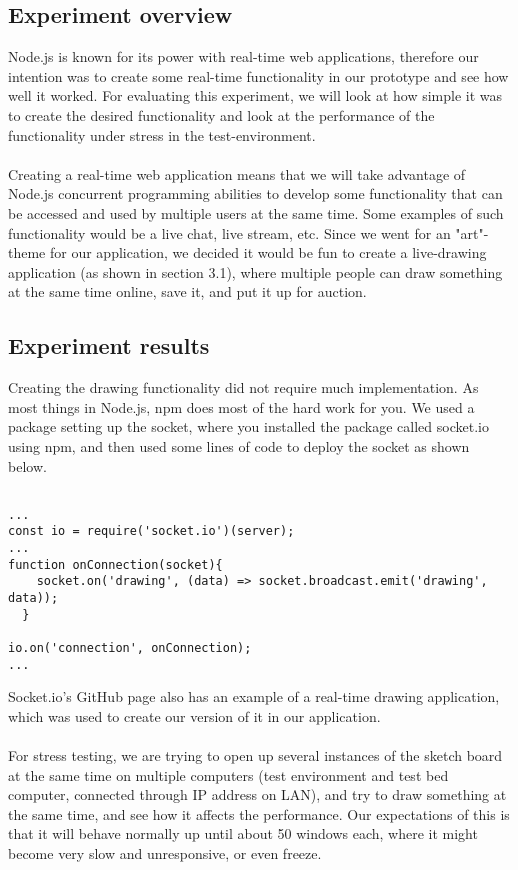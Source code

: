 \subsection{Experiment overview}
Node.js is known for its power with real-time web applications, therefore our intention was to create some real-time functionality in our prototype and see how well it worked. For evaluating this experiment, we will look at how simple it was to create the desired functionality and look at the performance of the functionality under stress in the test-environment.
\\\\
Creating a real-time web application means that we will take advantage of Node.js concurrent programming abilities to develop some functionality that can be accessed and used by multiple users at the same time. Some examples of such functionality would be a live chat, live stream, etc. Since we went for an "art"-theme for our application, we decided it would be fun to create a live-drawing application (as shown in section 3.1), where multiple people can draw something at the same time online, save it, and put it up for auction.

\subsection{Experiment results}
Creating the drawing functionality did not require much implementation. As most things in Node.js, npm does most of the hard work for you. We used a package setting up the socket, where you installed the package called socket.io using npm, and then used some lines of code to deploy the socket as shown below. \cite{instructions:socketio}

\begin{verbatim}

...
const io = require('socket.io')(server);
...
function onConnection(socket){
    socket.on('drawing', (data) => socket.broadcast.emit('drawing', data));
  }
  
io.on('connection', onConnection);
...
\end{verbatim}

Socket.io's GitHub page \cite{instructions:socketio} also has an example of a real-time drawing application, which was used to create our version of it in our application.
\\\\
For stress testing, we are trying to open up several instances of the sketch board at the same time on multiple computers (test environment and test bed computer, connected through IP address on LAN), and try to draw something at the same time, and see how it affects the performance. Our expectations of this is that it will behave normally up until about 50 windows each, where it might become very slow and unresponsive, or even freeze.
\\

